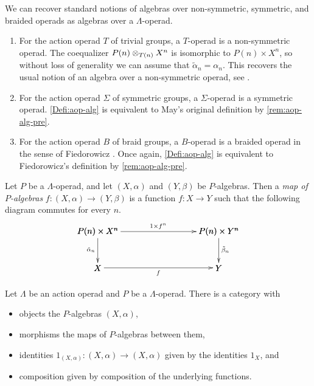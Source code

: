 \begin{example}\label{ex:lop-alg-exs}
We can recover standard notions of algebras over non-symmetric, symmetric, and braided operads as algebras over a $\Lambda$-operad.
  \begin{enumerate}
    \item For the action operad $T$ of trivial groups, a $T$-operad is a non-symmetric operad. The coequalizer $\coeq{P}{X}{T}{n}$ is isomorphic to $P(n) \times X^n$, so without loss of generality we can assume that $\tilde{\alpha}_n=\alpha_n$. This recovers the usual notion of an algebra over a non-symmetric operad, see \cite[Definition 1.20]{mss-op}.
    \item For the action operad $\Sigma$ of symmetric groups, a $\Sigma$-operad is a symmetric operad. \cref{Defi:aop-alg} is equivalent to May's original definition \cite[Definition 1.1]{maygeom} by \cref{rem:aop-alg-pre}.
    \item For the action operad $B$ of braid groups, a $B$-operad is a braided operad in the sense of Fiedorowicz \cite{fie-br}. Once again, \cref{Defi:aop-alg} is equivalent to Fiedorowicz's definition \cite[Definition 3.2]{fie-br} by \cref{rem:aop-alg-pre}.
  \end{enumerate}
\end{example}


\begin{Defi}\label{Defi:map-palg}
Let $P$ be a $\Lambda$-operad, and let $(X, \alpha)$ and $(Y, \beta)$ be $P$-algebras. Then a \emph{map of $P$-algebras} $f \colon  (X, \alpha) \rightarrow (Y, \beta)$ is a function $f \colon X \rightarrow Y$ such that the following diagram commutes for every $n$.
  \[
    \xy
      {\ar^{1 \times f^{n}} (0,0)*+{P(n) \times X^{n}}; (50,0)*+{P(n) \times Y^{n}} };
      {\ar^{\tilde{\beta}_{n}} (50,0)*+{P(n) \times Y^{n}}; (50,-15)*+{Y} };
      {\ar_{\tilde{\alpha}_{n}} (0,0)*+{P(n) \times X^{n}}; (0,-15)*+{X} };
      {\ar_{f} (0,-15)*+{X}; (50,-15)*+{Y} };
    \endxy
  \]
\end{Defi}

\begin{prop}\label{prop:cat-of-Palg}
Let $\Lambda$ be an action operad and $P$ be a $\Lambda$-operad.
There is a category with 
\begin{itemize}
\item objects the $P$-algebras $(X, \alpha)$, 
\item morphisms the maps of $P$-algebras between them,
\item identities $1_{(X, \alpha)} \colon (X, \alpha) \to (X, \alpha)$ given by the identities $1_X$, and
\item composition given by composition of the underlying functions.
\end{itemize}
\end{prop}

